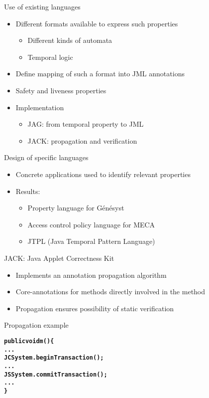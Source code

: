 \documentclass[final,nocolorBG,a4,marieke,nototal,ps, accumulate,slideColor]{prosper}
\begin{document}
\begin{slide}{Use of existing languages}
\begin{itemize}
\item Different formats available to express such properties
\begin{itemize}
\item Different kinds of automata
\item Temporal logic
\end{itemize}
\item Define mapping of such a format into JML annotations
\item Safety and liveness properties
\item Implementation 
\begin{itemize}
\item JAG: from temporal property to JML
\item JACK: propagation and verification
\end{itemize}
\end{itemize}
\end{slide}

\begin{slide}{Design of specific languages}
\begin{itemize}
\item Concrete applications used to identify relevant properties
\item Results: 
\begin{itemize}
\item Property language for G\'en\'esyst 
\item Access control policy language for MECA
\item JTPL (Java Temporal Pattern Language)
\end{itemize}
\end{itemize}
\end{slide}

\begin{slide}{JACK: Java Applet Correctness Kit}
\begin{itemize}
\item Implements an annotation propagation algorithm
\item Core-annotations for methods directly involved in the method
\item Propagation ensures possibility of static verification
\end{itemize}
\end{slide}

\begin{slide}{Propagation example}
\begin{alltt}
\textbf{public void m() \{
   ...
   JCSystem.beginTransaction();
   ...
   JSSystem.commitTransaction();
   ...
   \}}
\end{alltt}
\end{slide}
\end{document}
